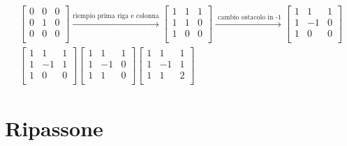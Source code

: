 \begin{gather*}
	\begin{bmatrix}
		0 & 0 & 0 \\
		0 & 1 & 0 \\
		0 & 0 & 0 \\
	\end{bmatrix}
	\xrightarrow{\text{riempio prima riga e colonna}}
	\begin{bmatrix}
		1 & 1 & 1 \\
		1 & 1 & 0 \\
		1 & 0 & 0 \\
	\end{bmatrix}
	\xrightarrow{\text{ cambio ostacolo in -1}}
	\begin{bmatrix}
		1 & 1  & 1 \\
		1 & -1 & 0 \\
		1 & 0  & 0 \\
	\end{bmatrix}
	\\
	\begin{bmatrix}
		1 & 1  & 1 \\
		1 & -1 & 1 \\
		1 & 0  & 0 \\
	\end{bmatrix}
	\begin{bmatrix}
		1 & 1  & 1 \\
		1 & -1 & 0 \\
		1 & 1  & 0 \\
	\end{bmatrix}
	\begin{bmatrix}
		1 & 1  & 1 \\
		1 & -1 & 1 \\
		1 & 1  & 2 \\
	\end{bmatrix}
\end{gather*}
\section{Ripassone}
